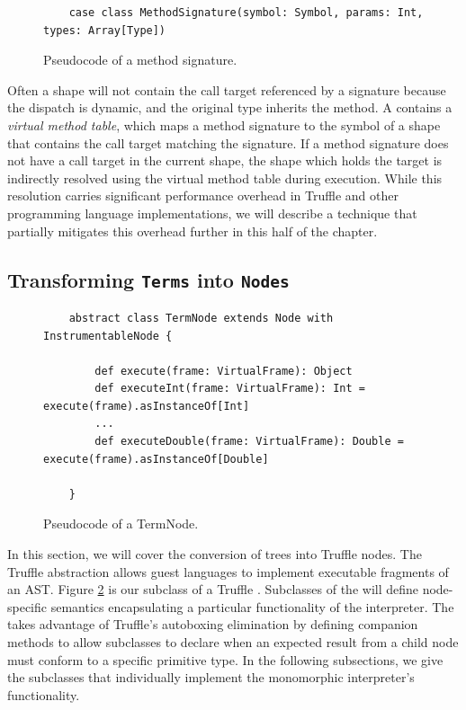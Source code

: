 \begin{figure}[!htb]
	\begin{verbatim}
	case class MethodSignature(symbol: Symbol, params: Int, types: Array[Type])
	\end{verbatim}
	\caption{Pseudocode of a method signature.}
	\label{impl:method-signature}
\end{figure}

Often a shape will not contain the call target referenced by a signature because the dispatch is dynamic, and the original type inherits the method.
A  contains a \textit{virtual method table}, which maps a method signature to the symbol of a shape that contains the call target matching the signature.
If a method signature does not have a call target in the current shape, the shape which holds the target is indirectly resolved using the virtual method table during execution.
While this resolution carries significant performance overhead in Truffle and other programming language implementations, we will describe a technique that partially mitigates this overhead further in this half of the chapter.

\subsection{Transforming \texttt{Terms} into \texttt{Nodes}}

\begin{figure}[!htb]
	\begin{verbatim}
	abstract class TermNode extends Node with InstrumentableNode {
	
		def execute(frame: VirtualFrame): Object 
		def executeInt(frame: VirtualFrame): Int = execute(frame).asInstanceOf[Int]
		...
		def executeDouble(frame: VirtualFrame): Double = execute(frame).asInstanceOf[Double]

	}
	\end{verbatim}
	\caption{Pseudocode of a TermNode.}
	\label{impl:term-node}
\end{figure}

In this section, we will cover the conversion of  trees into Truffle nodes.
The Truffle  abstraction allows guest languages to implement executable fragments of an AST.
Figure \ref{impl:term-node} is our subclass of a Truffle .
Subclasses of the  will define node-specific semantics encapsulating a particular functionality of the interpreter.
The  takes advantage of Truffle's autoboxing elimination by defining companion  methods to allow subclasses to declare when an expected result from a child node must conform to a specific primitive type.
In the following subsections, we give the subclasses that individually implement the monomorphic interpreter's functionality.

